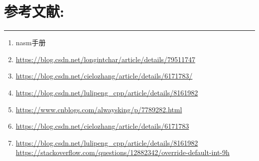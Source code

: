 \documentclass[UTF8]{article}
\begin{document}
\section{参考文献:}
\noindent\rule[0.2\baselineskip]{\textwidth}{0.5pt}
\begin{enumerate}[1)]
 \item nasm手册
 \item \url{https://blog.csdn.net/longintchar/article/details/79511747}
 \item \url{https://blog.csdn.net/cielozhang/article/details/6171783/}
 \item \url{https://blog.csdn.net/lulipeng_cpp/article/details/8161982}
 \item \url{https://www.cnblogs.com/alwaysking/p/7789282.html}
\item \url{https://blog.csdn.net/cielozhang/article/details/6171783}
\item
\url{https://blog.csdn.net/lulipeng_cpp/article/details/8161982}
\url{https://stackoverflow.com/questions/12882342/override-default-int-9h}
\end{enumerate}
\end{document}
